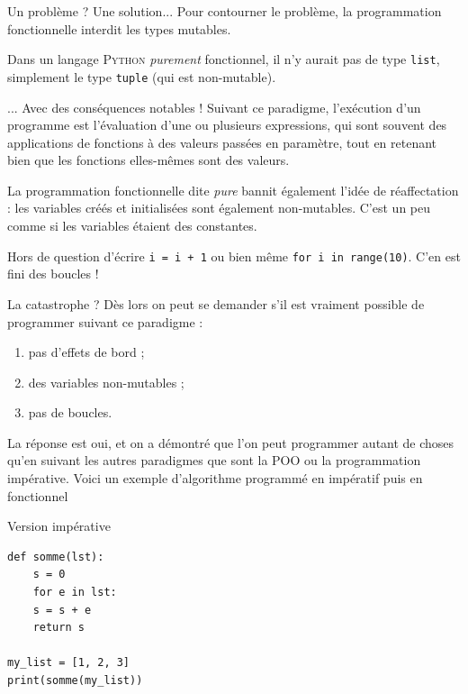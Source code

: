 \documentclass[10pt]{beamer}
\begin{document}
\begin{frame}[fragile]{Un problème ? Une solution...}
Pour contourner le problème, la programmation fonctionnelle interdit les types mutables.\\\pause

Dans un langage \textsc{Python} \textit{purement} fonctionnel, il n'y aurait pas de type \texttt{list}, simplement le type \texttt{tuple} (qui est non-mutable).\\
\end{frame}


\begin{frame}[fragile]{... Avec des conséquences notables !}
Suivant ce paradigme, l'exécution d'un programme est l'évaluation d'une ou plusieurs expressions, qui sont souvent des applications de fonctions à des valeurs passées en paramètre, tout en retenant bien que les fonctions elles-mêmes sont des valeurs.\\\pause 

La programmation fonctionnelle dite \textit{pure} bannit également l'idée de réaffectation : les variables créés et initialisées sont également non-mutables. C'est un peu comme si \og les variables étaient des constantes\fg{}.\\\pause

Hors de question d'écrire \texttt{i = i + 1} ou  bien même \texttt{for i in range(10)}. C'en est fini des boucles !\\
\end{frame}

\begin{frame}[fragile]{La catastrophe ?}
Dès lors on peut se demander s'il est vraiment possible de programmer suivant ce paradigme :\pause
\begin{enumerate}[--]
	\item 	pas d'effets de bord ;\pause 
	\item 	des variables non-mutables ;\pause
	\item 	pas de boucles.\pause 
\end{enumerate}
La réponse est oui, et on a démontré que l'on peut programmer autant de choses qu'en suivant les autres paradigmes que sont la POO ou la programmation impérative. Voici un exemple d'algorithme programmé en impératif puis en fonctionnel
\end{frame}

\begin{frame}[fragile]{Version impérative}
\begin{verbatim}
def somme(lst):
    s = 0
    for e in lst:
    s = s + e
    return s

my_list = [1, 2, 3]
print(somme(my_list))
\end{verbatim}
\end{frame}
\end{document}
